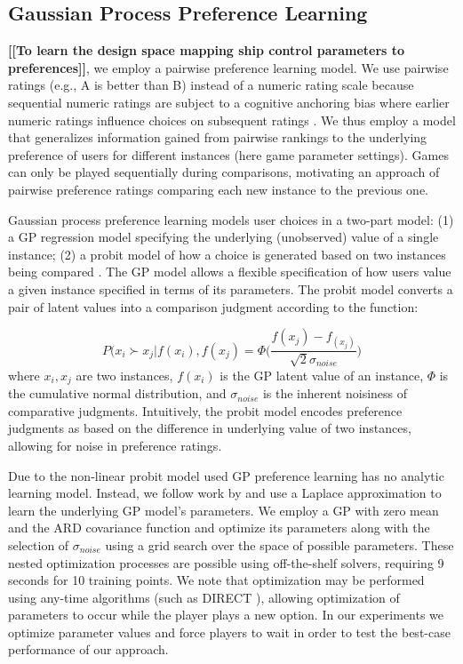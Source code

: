 \documentclass{sig-alternate}
\newcommand{\mytodo}[1]{\textbf{[[#1]]}}
\begin{document}
\subsection{Gaussian Process Preference Learning}

\mytodo{To learn the design space mapping ship control parameters to preferences}, we employ a pairwise preference learning model.
We use pairwise ratings (e.g., A is better than B) instead of a numeric rating scale because
sequential numeric ratings are subject to a cognitive anchoring bias where earlier numeric ratings influence choices on subsequent ratings \cite{tversky1974:biases}. We thus employ a model that generalizes information gained from pairwise rankings to the underlying preference of users for different instances (here game parameter settings). Games can only be played sequentially during comparisons, motivating an approach of pairwise preference ratings comparing each new instance to the previous one.

Gaussian process preference learning models user choices in a two-part model: (1) a GP regression model specifying the underlying  (unobserved) value of a single instance; (2) a probit model of how a choice is generated based on two instances being compared \cite{chu2005}. The GP model allows a flexible specification of how users value a given instance specified in terms of its parameters. The probit model
converts a pair of latent values into a comparison judgment according to the function:

$$ P( x_i \succ x_j | f(x_i), f(x_j) = \Phi\bigg( \frac{f(x_j) - f_(x_j)}{\sqrt{2} \sigma_{noise}} \bigg) $$
where $x_i, x_j$ are two instances, $f(x_i)$ is the GP latent value of an instance, $\Phi$ is the cumulative normal distribution, and $\sigma_{noise}$ is the inherent noisiness of comparative judgments. Intuitively, the probit model encodes preference judgments as based on the difference in underlying value of two instances, allowing for noise in preference ratings. 

Due to the non-linear probit model used GP preference learning has no analytic learning model. Instead, we follow work by \cite{chu2005} and use a Laplace approximation to learn the underlying GP model's parameters. We employ a GP with zero mean and the ARD covariance function and optimize its parameters along with the selection of $\sigma_{noise}$ using a grid search over the space of possible parameters. These nested optimization processes are possible using off-the-shelf solvers, requiring 9 seconds for 10 training points. 
We note that optimization may be performed using any-time algorithms (such as DIRECT \cite{jones1993:direct}), allowing optimization of parameters to occur while the player plays a new option. In our experiments we optimize parameter values and force players to wait in order to test the best-case performance of our approach.
\end{document}
